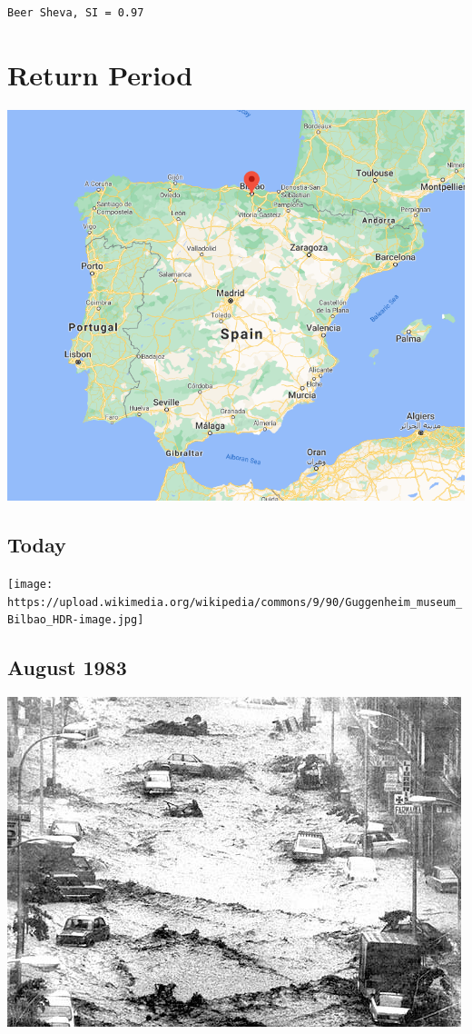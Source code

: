 \documentclass[
  letterpaper,
  DIV=11,
  numbers=noendperiod]{scrreprt}
\begin{document}
\begin{verbatim}
Beer Sheva, SI = 0.97
\end{verbatim}

\hypertarget{return-period}{%
\chapter{Return Period}\label{return-period}}

\includegraphics{archive/figures/bilbao-map.png}

\hypertarget{today}{%
\section{Today}\label{today}}

\texttt{[image: https://upload.wikimedia.org/wikipedia/commons/9/90/Guggenheim\_museum\_Bilbao\_HDR-image.jpg]}

\hypertarget{august-1983}{%
\section{August 1983}\label{august-1983}}

\includegraphics{archive/figures/bilbao-flood-cars.jpg}
\end{document}
